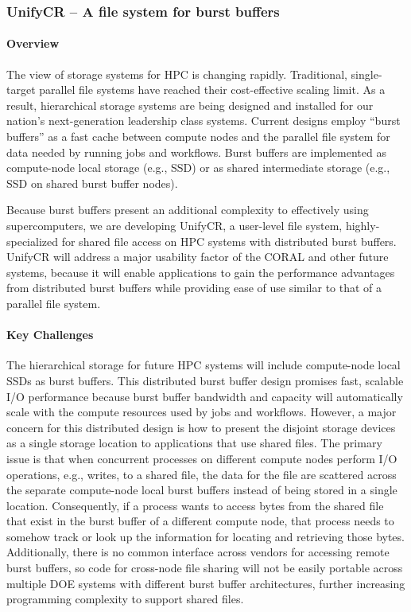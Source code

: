 \subsubsection{UnifyCR -- A file system for burst buffers} 

\paragraph{Overview} 

The view of storage systems for HPC is changing rapidly. Traditional, 
single-target parallel file systems have reached their cost-effective 
scaling limit. As a result, hierarchical storage systems are being designed 
and installed for our nation's next-generation leadership class systems. 
Current designs employ “burst buffers” as a fast cache between compute 
nodes and the parallel file system for data needed by running jobs and 
workflows. Burst buffers are implemented as compute-node local storage 
(e.g., SSD) or as shared intermediate storage (e.g., SSD on shared burst 
buffer nodes).

Because burst buffers present an additional complexity to effectively
using supercomputers, we are developing UnifyCR, a user-level file system, 
highly-specialized for shared file access on HPC systems with distributed 
burst buffers.  UnifyCR will address a major usability 
factor of the CORAL and other future systems, because it will enable 
applications to gain the performance advantages from distributed burst buffers 
while providing ease of use similar to that of a parallel file system.


\paragraph{Key  Challenges}

The hierarchical storage for future HPC systems will include compute-node
local SSDs as burst buffers. This distributed burst buffer design promises
fast, scalable I/O performance because burst buffer bandwidth and capacity
will automatically scale with the compute resources used by jobs and
workflows. However, a major concern for this distributed design is how to
present the disjoint storage devices as a single storage location to
applications that use shared files. The primary issue is that when concurrent
processes on different compute nodes perform I/O operations, e.g., writes,
to a shared file, the data for the file are scattered across the separate
compute-node local burst buffers instead of being stored in a single
location. Consequently, if a process wants to access bytes from the
shared file that exist in the burst buffer of a different compute node,
that process needs to somehow track or look up the information for locating
and retrieving those bytes. Additionally, there is no common interface across
vendors for accessing remote burst buffers, so code for cross-node file
sharing will not be easily portable across multiple DOE systems with
different burst buffer architectures, further increasing programming
complexity to support shared files.

